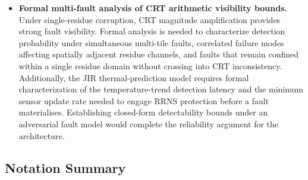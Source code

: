 \documentclass[journal]{IEEEtran}
\begin{document}
\begin{itemize}
Additionally, three engineering items arising from the wavelength and detector changes remain open:
\begin{enumerate}
\item $\mathrm{Sb_2S_3}$ phase-change optical contrast ( $\Delta$n, $\Delta$k) at 1064 nm has not been explicitly re-verified in large-scale vertical reservoir integrations; the effect is broadband and low-risk, but unconfirmed.
\item The Ge/Si $\mathrm{SAC^2M}$ APD operating point ($M = 7$, $F(M) = 2.0$, 105~GHz bandwidth) is a demonstrated device \cite{Chen2025}, but integration with the JANUS interleaved two-layer detector block has not been characterized.
\item Laser relative intensity noise (RIN) of the high-power Yb-fiber source becomes the dominant accuracy driver in the absence of an intermediate gain stage; formal RIN-to-BER analysis is required.
\end{enumerate}
\item  \textbf{Formal multi-fault analysis of CRT arithmetic visibility bounds.} Under single-residue corruption, CRT magnitude amplification provides strong fault visibility. Formal analysis is needed to characterize detection probability under simultaneous multi-tile faults, correlated failure modes affecting spatially adjacent residue channels, and faults that remain confined within a single residue domain without crossing into CRT inconsistency. Additionally, the JIR thermal-prediction model requires formal characterization of the temperature-trend detection latency and the minimum sensor update rate needed to engage RRNS protection before a fault materialises. Establishing closed-form detectability bounds under an adversarial fault model would complete the reliability argument for the architecture.
\end{itemize}

\subsection{\textbf{Notation Summary}}
\end{document}

